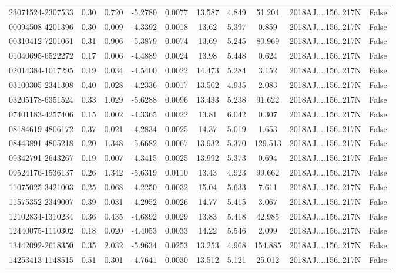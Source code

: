 \begin{tabular}{lccccccccc}
23071524-2307533 & 0.30 & 0.720 & -5.2780 & 0.0077 & 13.587 & 4.849 & 51.204 & 2018AJ....156..217N & False \\
00094508-4201396 & 0.30 & 0.009 & -4.3392 & 0.0018 & 13.62 & 5.397 & 0.859 & 2018AJ....156..217N & False \\
00310412-7201061 & 0.31 & 0.906 & -5.3879 & 0.0074 & 13.69 & 5.245 & 80.969 & 2018AJ....156..217N & False \\
01040695-6522272 & 0.17 & 0.006 & -4.4889 & 0.0024 & 13.98 & 5.448 & 0.624 & 2018AJ....156..217N & False \\
02014384-1017295 & 0.19 & 0.034 & -4.5400 & 0.0022 & 14.473 & 5.284 & 3.152 & 2018AJ....156..217N & False \\
03100305-2341308 & 0.40 & 0.028 & -4.2336 & 0.0017 & 13.502 & 4.935 & 2.083 & 2018AJ....156..217N & False \\
03205178-6351524 & 0.33 & 1.029 & -5.6288 & 0.0096 & 13.433 & 5.238 & 91.622 & 2018AJ....156..217N & False \\
07401183-4257406 & 0.15 & 0.002 & -4.3365 & 0.0022 & 13.81 & 6.042 & 0.307 & 2018AJ....156..217N & False \\
08184619-4806172 & 0.37 & 0.021 & -4.2834 & 0.0025 & 14.37 & 5.019 & 1.653 & 2018AJ....156..217N & False \\
08443891-4805218 & 0.20 & 1.348 & -5.6682 & 0.0067 & 13.932 & 5.370 & 129.513 & 2018AJ....156..217N & False \\
09342791-2643267 & 0.19 & 0.007 & -4.3415 & 0.0025 & 13.992 & 5.373 & 0.694 & 2018AJ....156..217N & False \\
09524176-1536137 & 0.26 & 1.342 & -5.6319 & 0.0110 & 13.43 & 4.923 & 99.662 & 2018AJ....156..217N & False \\
11075025-3421003 & 0.25 & 0.068 & -4.2250 & 0.0032 & 15.04 & 5.633 & 7.611 & 2018AJ....156..217N & False \\
11575352-2349007 & 0.39 & 0.031 & -4.2952 & 0.0026 & 14.77 & 5.415 & 3.067 & 2018AJ....156..217N & False \\
12102834-1310234 & 0.36 & 0.435 & -4.6892 & 0.0029 & 13.83 & 5.418 & 42.985 & 2018AJ....156..217N & False \\
12440075-1110302 & 0.18 & 0.020 & -4.4053 & 0.0033 & 14.22 & 5.546 & 2.099 & 2018AJ....156..217N & False \\
13442092-2618350 & 0.35 & 2.032 & -5.9634 & 0.0253 & 13.253 & 4.968 & 154.885 & 2018AJ....156..217N & False \\
14253413-1148515 & 0.51 & 0.301 & -4.7641 & 0.0030 & 13.512 & 5.121 & 25.012 & 2018AJ....156..217N & False \\

\end{tabular}
